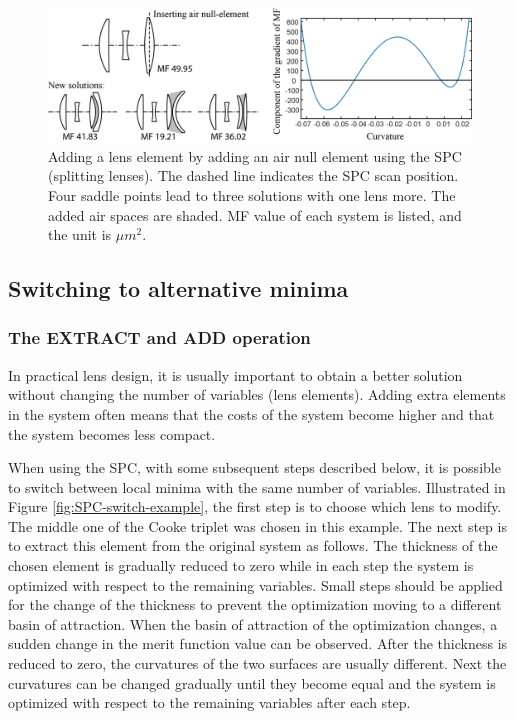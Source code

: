 \begin{figure}[h!]
    \centering
    \includegraphics[scale=0.68]{chapter-2/figures/spc_add_air.png}
    \caption{Adding a lens element by adding an air null element using the SPC (splitting lenses). The dashed line indicates the SPC scan position. Four saddle points lead to three solutions with one lens more. The added air spaces are shaded. MF value of each system is listed, and the unit is $\mu m^2$. }
    \label{fig:SPC-air null element}
\end{figure}

\label{cp2-switching}
\subsection{Switching to alternative minima}

\subsubsection{The EXTRACT and ADD operation}
In practical lens design, it is usually important to obtain a better solution without changing the number of variables (lens elements). Adding extra elements in the system often means that the costs of the system become higher and that the system becomes less compact. 

When using the SPC, with some subsequent steps described below, it is possible to switch between local minima with the same number of variables. Illustrated in Figure \ref{fig:SPC-switch-example}, the first step is to choose which lens to modify. The middle one of the Cooke triplet was chosen in this example. The next step is to extract this element from the original system as follows. The thickness of the chosen element is gradually reduced to zero while in each step the system is optimized with respect to the remaining variables. Small steps should be applied for the change of the thickness to prevent the optimization moving to a different basin of attraction. When the basin of attraction of the optimization changes, a sudden change in the merit function value can be observed. After the thickness is reduced to zero, the curvatures of the two surfaces are usually different. Next the curvatures can be changed gradually until they become equal and the system is optimized with respect to the remaining variables after each step. 

